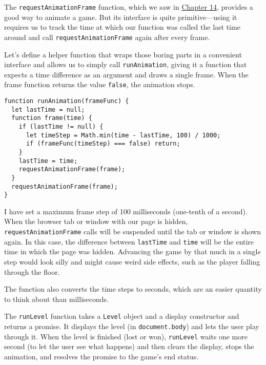 The \lstinline`requestAnimationFrame` function, which we saw in \hyperref[dom.animationFrame]{Chapter 14}, provides a good way to animate a game. But its interface is quite primitive—using it requires us to track the time at which our function was called the last time around and call \lstinline`requestAnimationFrame` again after every frame.

Let's define a helper function that wraps those boring parts in a convenient interface and allows us to simply call \lstinline`runAnimation`, giving it a function that expects a time difference as an argument and draws a single frame. When the frame function returns the value \lstinline`false`, the animation stops.

\begin{lstlisting}
function runAnimation(frameFunc) {
  let lastTime = null;
  function frame(time) {
    if (lastTime != null) {
      let timeStep = Math.min(time - lastTime, 100) / 1000;
      if (frameFunc(timeStep) === false) return;
    }
    lastTime = time;
    requestAnimationFrame(frame);
  }
  requestAnimationFrame(frame);
}
\end{lstlisting}
\noindent{}

I have set a maximum frame step of 100 milliseconds (one-tenth of a second). When the browser tab or window with our page is hidden, \lstinline`requestAnimationFrame` calls will be suspended until the tab or window is shown again. In this case, the difference between \lstinline`lastTime` and \lstinline`time` will be the entire time in which the page was hidden. Advancing the game by that much in a single step would look silly and might cause weird side effects, such as the player falling through the floor.

The function also converts the time steps to seconds, which are an easier quantity to think about than milliseconds.

The \lstinline`runLevel` function takes a \lstinline`Level` object and a display constructor and returns a promise. It displays the level (in \lstinline`document.body`) and lets the user play through it. When the level is finished (lost or won), \lstinline`runLevel` waits one more second (to let the user see what happens) and then clears the display, stops the animation, and resolves the promise to the game's end status.

